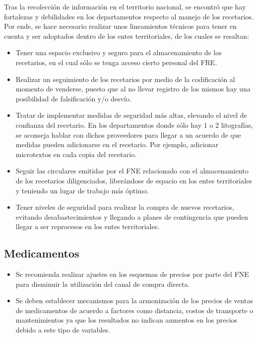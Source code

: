 \documentclass[
]{book}
\begin{document}
Tras la recolección de información en el territorio nacional, se encontró que hay fortalezas y debilidades en los departamentos respecto al manejo de los recetarios. Por ende, se hace necesario realizar unos lineamientos técnicos para tener en cuenta y ser adoptados dentro de los entes territoriales, de los cuales se resaltan:

\begin{itemize}
\item
  Tener una espacio exclusivo y seguro para el almacenamiento de los recetarios, en el cual sólo se tenga acceso cierto personal del FRE.
\item
  Realizar un seguimiento de los recetarios por medio de la codificación al momento de venderse, puesto que al no llevar registro de los mismos hay una posibilidad de falsificación y/o desvío.
\item
  Tratar de implementar medidas de seguridad más altas, elevando el nivel de confianza del recetario. En los departamentos donde sólo hay 1 o 2 litografías, se aconseja hablar con dichos proveedores para llegar a un acuerdo de que medidas pueden adicionarse en el recetario. Por ejemplo, adicionar microtextos en cada copia del recetario.
\item
  Seguir las circulares emitidas por el FNE relacionado con el almacenamiento de los recetarios diligenciados, liberándose de espacio en los entes territoriales y teniendo un lugar de trabajo más óptimo.
\item
  Tener niveles de seguridad para realizar la compra de nuevos recetarios, evitando desabastecimientos y llegando a planes de contingencia que pueden llegar a ser reprocesos en los entes territoriales.
\end{itemize}

\hypertarget{medicamentos}{%
\subsection{Medicamentos}\label{medicamentos}}

\begin{itemize}
\item
  Se recomienda realizar ajustes en los esquemas de precios por parte del FNE para disminuir la utilización del canal de compra directa.
\item
  Se deben establecer mecanismos para la armonización de los precios de ventas de medicamentos de acuerdo a factores como distancia, costos de transporte o mantenimientos ya que los resultados no indican aumentos en los precios debido a este tipo de variables.
\end{itemize}
\end{document}
